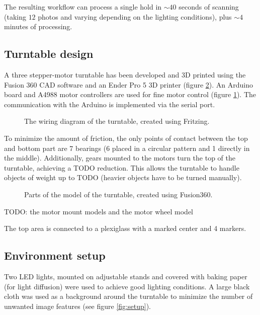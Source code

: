 The resulting workflow can process a single hold in $\sim 40$ seconds of scanning (taking $12$ photos and varying depending on the lighting conditions), plus  $\sim4$ minutes of processing.

\subsection{Turntable design}
A three stepper-motor turntable has been developed and 3D printed using the Fusion 360 CAD software and an Ender Pro 5 3D printer (figure \ref{fig:turntable}).
An Arduino board and A4988 motor controllers are used for fine motor control (figure \ref{fig:wiring}).
The communication with the Arduino is implemented via the serial port.

\begin{figure}
	\centering
	
	\caption{The wiring diagram of the turntable, created using Fritzing.}
	\label{fig:wiring}
\end{figure}

To minimize the amount of friction, the only points of contact between the top and bottom part are 7 bearings (6 placed in a circular pattern and 1 directly in the middle).
Additionally, gears mounted to the motors turn the top of the turntable, achieving a TODO reduction.
This allows the turntable to handle objects of weight up to TODO (heavier objects have to be turned manually).

\begin{figure}
	\centering
	\hfill
	\hfill
	\caption{Parts of the model of the turntable, created using Fusion360.}%
	\label{fig:turntable}
\end{figure}

TODO: the motor mount models and the motor wheel model

The top area is connected to a plexiglass with a marked center and 4 markers.

\subsection{Environment setup}
Two LED lights, mounted on adjustable stands and covered with baking paper (for light diffusion) were used to achieve good lighting conditions.
A large black cloth was used as a background around the turntable to minimize the number of unwanted image features (see figure \ref{fig:setup}).

